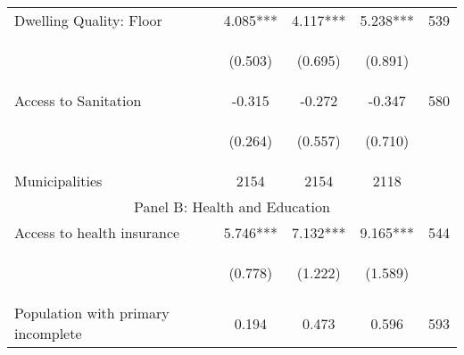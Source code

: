 \begin{tabular}{lcccc}
Dwelling Quality: Floor          		  &  4.085***    &    4.117***   &     5.238***  &  539 \\

\vspace{4pt} &  \begin{footnotesize}(0.503)\end{footnotesize}   &
			    \begin{footnotesize}(0.695)\end{footnotesize}   &
			    \begin{footnotesize}(0.891)\end{footnotesize}   &
			     \\          


Access to Sanitation          		  &  -0.315    &   -0.272    &     -0.347  &  580  \\

\vspace{4pt} &  \begin{footnotesize}(0.264)\end{footnotesize}   &
			    \begin{footnotesize}(0.557)\end{footnotesize}   &
			    \begin{footnotesize}(0.710)\end{footnotesize}   &
			     \\          

Municipalities  &   2154   &    2154     &  2118      \\

\hline		
\multicolumn{5}{c}{Panel B: Health and Education}   \\                                                          


Access to health insurance      &  5.746***    &    7.132***   &     9.165***  &  544    \\

\vspace{4pt} &  \begin{footnotesize}(0.778)\end{footnotesize}   &
			    \begin{footnotesize}(1.222)\end{footnotesize}   &
			    \begin{footnotesize}(1.589)\end{footnotesize}   &
			     \\          


Population with primary incomplete  &  0.194    &    0.473   &     0.596  &  593  \\


\end{tabular}

